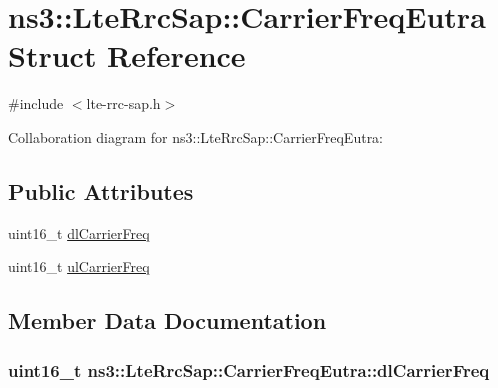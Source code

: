 \hypertarget{structns3_1_1LteRrcSap_1_1CarrierFreqEutra}{}\section{ns3\+:\+:Lte\+Rrc\+Sap\+:\+:Carrier\+Freq\+Eutra Struct Reference}
\label{structns3_1_1LteRrcSap_1_1CarrierFreqEutra}


{\ttfamily \#include $<$lte-\/rrc-\/sap.\+h$>$}



Collaboration diagram for ns3\+:\+:Lte\+Rrc\+Sap\+:\+:Carrier\+Freq\+Eutra\+:
\subsection*{Public Attributes}
\begin{DoxyCompactItemize}
\item 
uint16\+\_\+t \hyperlink{structns3_1_1LteRrcSap_1_1CarrierFreqEutra_a2f0cfcc34c57b48596e7ade28ac43574}{dl\+Carrier\+Freq}
\item 
uint16\+\_\+t \hyperlink{structns3_1_1LteRrcSap_1_1CarrierFreqEutra_a0b7492409484ac03d4bdf7719cb47a0a}{ul\+Carrier\+Freq}
\end{DoxyCompactItemize}


\subsection{Member Data Documentation}
\subsubsection[{\texorpdfstring{dl\+Carrier\+Freq}{dlCarrierFreq}}]{\setlength{\rightskip}{0pt plus 5cm}uint16\+\_\+t ns3\+::\+Lte\+Rrc\+Sap\+::\+Carrier\+Freq\+Eutra\+::dl\+Carrier\+Freq}\hypertarget{structns3_1_1LteRrcSap_1_1CarrierFreqEutra_a2f0cfcc34c57b48596e7ade28ac43574}{}\label{structns3_1_1LteRrcSap_1_1CarrierFreqEutra_a2f0cfcc34c57b48596e7ade28ac43574}
